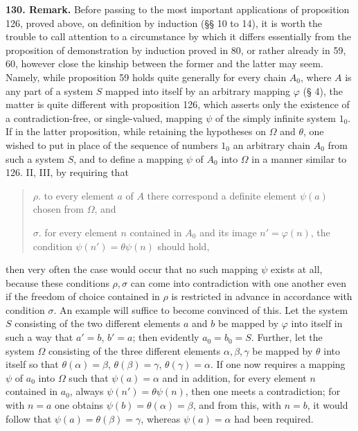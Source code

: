 \documentclass[11pt]{article}
\begin{document}
\noindent\textbf{130. Remark.} Before passing to the most important applications of proposition 126, proved above, on definition by induction (§§ 10 to 14), it is worth the trouble to call attention to a circumstance by which it differs essentially from the proposition of demonstration by induction proved in 80, or rather already in 59, 60, however close the kinship between the former and the latter may seem. Namely, while proposition 59 holds quite generally for every chain $A_0$, where $A$ is any part of a system $S$ mapped into itself by an arbitrary mapping $\varphi$ (§ 4), the matter is quite different with proposition 126, which asserts only the existence of a contradiction-free, or single-valued, mapping $\psi$ of the simply infinite system $1_0$. If in the latter proposition, while retaining the hypotheses on $\Omega$ and $\theta$, one wished to put in place of the sequence of numbers $1_0$ an arbitrary chain $A_0$ from such a system $S$, and to define a mapping $\psi$ of $A_0$ into $\Omega$ in a manner similar to 126. II, III, by requiring that
\begin{quote}
$\rho.$ to every element $a$ of $A$ there correspond a definite element $\psi(a)$ chosen from $\Omega$, and

$\sigma.$ for every element $n$ contained in $A_0$ and its image $n'=\varphi(n)$, the condition $\psi(n')=\theta\psi(n)$ should hold,
\end{quote}
then very often the case would occur that no such mapping $\psi$ exists at all, because these conditions $\rho,\sigma$ can come into contradiction with one another even if the freedom of choice contained in $\rho$ is restricted in advance in accordance with condition $\sigma$. An example will suffice to become convinced of this. Let the system $S$ consisting of the two different elements $a$ and $b$ be mapped by $\varphi$ into itself in such a way that $a'=b$, $b'=a$; then evidently $a_0=b_0=S$. Further, let the system $\Omega$ consisting of the three different elements $\alpha,\beta,\gamma$ be mapped by $\theta$ into itself so that $\theta(\alpha)=\beta$, $\theta(\beta)=\gamma$, $\theta(\gamma)=\alpha$. If one now requires a mapping $\psi$ of $a_0$ into $\Omega$ such that $\psi(a)=\alpha$ and in addition, for every element $n$ contained in $a_0$, always $\psi(n')=\theta\psi(n)$, then one meets a contradiction; for with $n=a$ one obtains $\psi(b)=\theta(\alpha)=\beta$, and from this, with $n=b$, it would follow that $\psi(a)=\theta(\beta)=\gamma$, whereas $\psi(a)=\alpha$ had been required.
\end{document}

